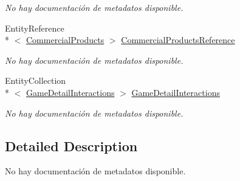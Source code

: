 \begin{DoxyCompactItemize}
\begin{DoxyCompactList}\small\item\em No hay documentación de metadatos disponible. \end{DoxyCompactList}\item 
Entity\-Reference\\*
$<$ \hyperlink{class_microsoft_1_1_samples_1_1_kinect_1_1_basic_interactions_1_1_commercial_products}{Commercial\-Products} $>$ \hyperlink{class_microsoft_1_1_samples_1_1_kinect_1_1_basic_interactions_1_1_game_details_a0f6fb44e2c0d904b0625f2a4461cbac5}{Commercial\-Products\-Reference}
\begin{DoxyCompactList}\small\item\em No hay documentación de metadatos disponible. \end{DoxyCompactList}\item 
Entity\-Collection\\*
$<$ \hyperlink{class_microsoft_1_1_samples_1_1_kinect_1_1_basic_interactions_1_1_game_detail_interactions}{Game\-Detail\-Interactions} $>$ \hyperlink{class_microsoft_1_1_samples_1_1_kinect_1_1_basic_interactions_1_1_game_details_a3c6249cbeb44f20ebba9a4d4927abf20}{Game\-Detail\-Interactions}
\begin{DoxyCompactList}\small\item\em No hay documentación de metadatos disponible. \end{DoxyCompactList}\end{DoxyCompactItemize}


\subsection{Detailed Description}
No hay documentación de metadatos disponible. 



